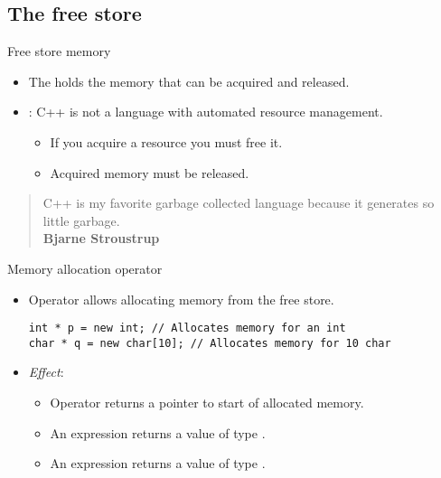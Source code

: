 \subsection{The free store}

\begin{frame}[t]{Free store memory}
\begin{itemize}
  \item The  holds the memory that can be
        acquired and released.

  \vfill
  \item {}:
        C++ is not a language with automated resource management. 
    \begin{itemize}
      \item If you acquire a resource you must free it.
      \item Acquired memory must be released.
    \end{itemize}
\end{itemize}
\vfill
\begin{quote}
C++ is my favorite garbage collected language
because it generates so little garbage.
\\
\textbf{Bjarne Stroustrup}
\end{quote}
\end{frame}

\begin{frame}[t,fragile]{Memory allocation operator}
\begin{itemize}
  \item Operator  allows allocating memory from the free store.
\begin{lstlisting}
int * p = new int; // Allocates memory for an int
char * q = new char[10]; // Allocates memory for 10 char
\end{lstlisting}

  \vfill
  \item \emph{Effect}:
    \begin{itemize}
      \item Operator  returns a pointer to start of allocated memory.
      \item An expression   returns a value of type .
      \item An expression   returns a value of type .
    \end{itemize}
\end{itemize}
\end{frame}


